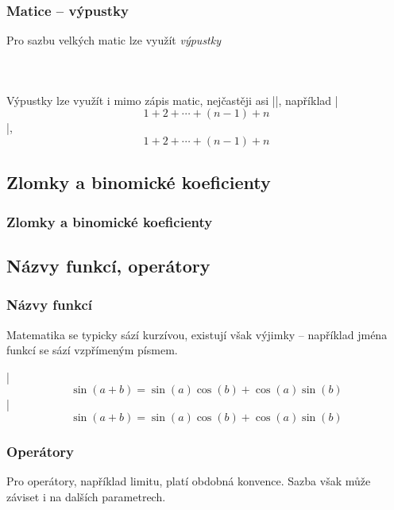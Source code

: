 \begin{frame}[fragile]
	\frametitle{Matice -- výpustky}
	Pro sazbu velkých matic lze využít \emph{výpustky}\par\bigskip
	\begin{columns}
		\begin{column}{0.4\textwidth}
			\begin{displaymath}
				
			\end{displaymath}
		\end{column}
		\begin{column}{0.6\textwidth}
		\end{column}
	\end{columns}
	\begin{remark}
		Výpustky lze využít i mimo zápis matic, nejčastěji asi |\cdots|, například |$$1 + 2 + \cdots + (n-1) + n$$|, $$1 + 2 + \cdots + (n-1) + n$$
	\end{remark}
\end{frame}


\subsection{Zlomky a binomické koeficienty}
\begin{frame}
	\frametitle{Zlomky a binomické koeficienty}
	\UnderConstruction
\end{frame}


\subsection{Názvy funkcí, operátory}
\begin{frame}[fragile]
	\frametitle{Názvy funkcí}
	Matematika se typicky sází kurzívou, existují však výjimky -- například jména funkcí se sází vzpřímeným písmem.\par
	|$$\sin(a + b) = \sin(a)\cos(b) + \cos(a)\sin(b)$$|
	$$\sin(a + b) = \sin(a)\cos(b) + \cos(a)\sin(b)$$
\end{frame}


\begin{frame}[fragile]
	\frametitle{Operátory}
	Pro operátory, například limitu, platí obdobná konvence. Sazba však může záviset i na dalších parametrech.
	\par\bigskip
	\par\bigskip
	
\end{frame}


